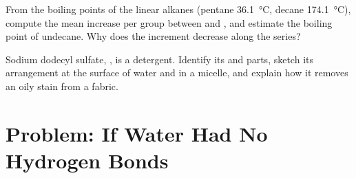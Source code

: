 \begin{exercise}[$\star\star\star$]\label{exo:b1:intermolecular-forces-solvents:11}
From the boiling points of the linear alkanes (pentane
\qty{36.1}{\celsius}, decane \qty{174.1}{\celsius}), compute the mean
increase per  group between  and , and estimate
the boiling point of undecane. Why does the increment decrease along the
series?
\end{exercise}

\begin{exercise}[$\star\star\star$]\label{exo:b1:intermolecular-forces-solvents:12}
Sodium dodecyl sulfate, , is a detergent. Identify
its  and  parts, sketch its arrangement at the
surface of water and in a micelle, and explain how it removes an oily
stain from a fabric.
\end{exercise}

\section{Problem: If Water Had No Hydrogen Bonds}

